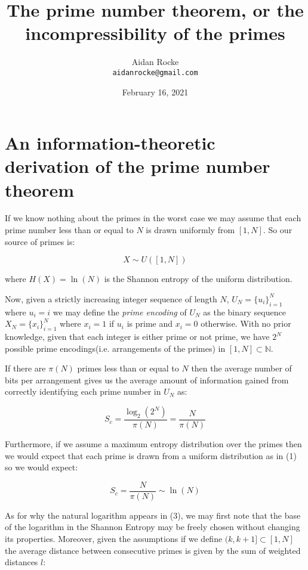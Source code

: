 \documentclass{article}
\title{The prime number theorem, or the incompressibility of the primes}
\date{February 16, 2021}
\author{%
  Aidan Rocke\\
  \texttt{aidanrocke@gmail.com} \\
}
\begin{document}
\maketitle

\section{An information-theoretic derivation of the prime number theorem}

If we know nothing about the primes in the worst case we may assume that each prime number less than or equal to $N$ is drawn uniformly from $[1,N]$. So our source of primes is:

\begin{equation}
X \sim U([1,N])
\end{equation}

where $H(X) = \ln(N)$ is the Shannon entropy of the uniform distribution.  

Now, given a strictly increasing integer sequence of length $N$, $U_N = \{u_i\}_{i=1}^N$ where $u_i = i$ we may define the \textit{prime encoding} of $U_N$ as the binary sequence $X_N = \{x_i\}_{i=1}^N$ where $x_i =1$ if $u_i$ is prime and
$x_i=0$ otherwise. With no prior knowledge, given that each integer is either prime or not prime,
we have $2^N$ possible prime encodings(i.e. arrangements of the primes) in $[1,N] \subset \mathbb{N}$.

If there are $\pi(N)$ primes less than or equal to $N$ then the average number of bits per arrangement gives us the average amount of information gained from correctly identifying each prime number in $U_N$ as:

\begin{equation}
S_c = \frac{\log_2 (2^N)}{\pi(N)}= \frac{N}{\pi(N)}
\end{equation}

Furthermore, if we assume a maximum entropy distribution over the primes then we would expect that each prime is drawn from a uniform distribution as in (1) so we would expect:

\begin{equation}
S_c = \frac{N}{\pi(N)} \sim \ln(N)
\end{equation}

As for why the natural logarithm appears in (3), we may first note that the base of the logarithm in the Shannon Entropy may be freely chosen without changing its properties. Moreover, given the assumptions if we define $(k,k+1] \subset [1,N]$ the average distance between consecutive primes is given by the sum of weighted distances $l$:
\end{document}
